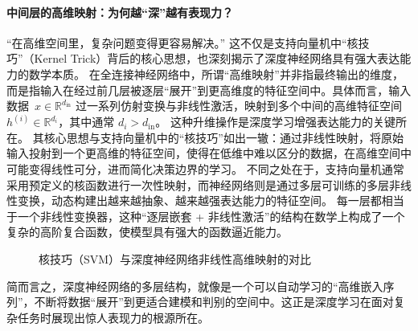 \paragraph*{中间层的高维映射：为何越“深”越有表现力？}
“在高维空间里，复杂问题变得更容易解决。” 这不仅是支持向量机中“核技巧”（Kernel Trick）背后的核心思想，也深刻揭示了深度神经网络具有强大表达能力的数学本质。
在全连接神经网络中，所谓“高维映射”并非指最终输出的维度，而是指输入在经过前几层被逐层“展开”到更高维度的特征空间中。具体而言，输入数据~$x \in \mathbb{R}^{d_{\text{in}}}$ 过一系列仿射变换与非线性激活，映射到多个中间的高维特征空间~$h^{(i)} \in \mathbb{R}^{d_i}$，其中通常 $d_i > d_{\text{in}}$。
这种升维操作是深度学习增强表达能力的关键所在。
其核心思想与支持向量机中的“核技巧”如出一辙：通过非线性映射，将原始输入投射到一个更高维的特征空间，使得在低维中难以区分的数据，在高维空间中可能变得线性可分，进而简化决策边界的学习。
不同之处在于，支持向量机通常采用预定义的核函数进行一次性映射，而神经网络则是通过多层可训练的多层非线性变换，动态构建出越来越抽象、越来越强表达能力的特征空间。
每一层都相当于一个非线性变换器，这种“逐层嵌套 + 非线性激活”的结构在数学上构成了一个复杂的高阶复合函数，使模型具有强大的函数逼近能力。
\begin{figure}[htbp]
\centering
{}
\caption{核技巧（SVM）与深度神经网络非线性高维映射的对比}
\label{核技巧与神经网络映射对比}
\end{figure}
简而言之，深度神经网络的多层结构，就像是一个可以自动学习的“高维嵌入序列”，不断将数据“展开”到更适合建模和判别的空间中。这正是深度学习在面对复杂任务时展现出惊人表现力的根源所在。
